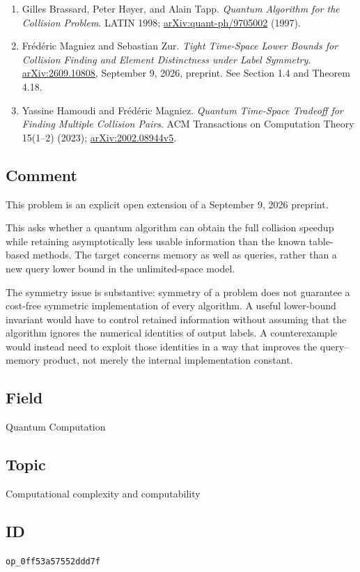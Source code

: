 \begin{enumerate}[label={},leftmargin=4.8em,labelsep=0.5em]
  \footnotesize
  \item[\textup{[Brassard98]}]\label{ref:0ff5-brassard98}
  Gilles Brassard, Peter Høyer, and Alain Tapp. \emph{Quantum Algorithm for the Collision Problem}. LATIN 1998; \href{https://arxiv.org/abs/quant-ph/9705002}{arXiv:quant-ph/9705002} (1997).

  \item[\textup{[Magniez26]}]\label{ref:0ff5-magniez26}
  Frédéric Magniez and Sebastian Zur. \emph{Tight Time-Space Lower Bounds for Collision Finding and Element Distinctness under Label Symmetry}. \href{https://arxiv.org/html/2609.10808v1}{arXiv:2609.10808}, September 9, 2026, preprint. See Section 1.4 and Theorem 4.18.

  \item[\textup{[Hamoudi23]}]\label{ref:0ff5-hamoudi23}
  Yassine Hamoudi and Frédéric Magniez. \emph{Quantum Time-Space Tradeoff for Finding Multiple Collision Pairs}. ACM Transactions on Computation Theory 15(1–2) (2023); \href{https://arxiv.org/abs/2002.08944v5}{arXiv:2002.08944v5}.
\end{enumerate}

\subsection*{Comment}

This problem is an explicit open extension of a September 9, 2026 preprint.

This asks whether a quantum algorithm can obtain the full collision speedup while retaining asymptotically less usable information than the known table-based methods. The target concerns memory as well as queries, rather than a new query lower bound in the unlimited-space model.

The symmetry issue is substantive: symmetry of a problem does not guarantee a cost-free symmetric implementation of every algorithm. A useful lower-bound invariant would have to control retained information without assuming that the algorithm ignores the numerical identities of output labels. A counterexample would instead need to exploit those identities in a way that improves the query–memory product, not merely the internal implementation constant.

\subsection*{Field}

Quantum Computation

\subsection*{Topic}

Computational complexity and computability

\subsection*{ID}

\texttt{op\_0ff53a57552ddd7f}
